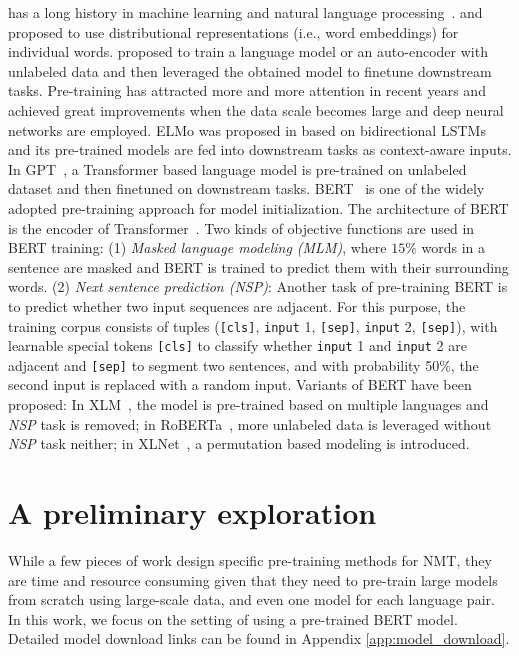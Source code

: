 \documentclass{article} \usepackage{iclr2020_conference,times}
\begin{document}
 has a long history in machine learning and natural language processing~\citep{erhan2009difficulty,erhan2010does}. \citet{mikolov2013distributed} and \citet{pennington2014glove} proposed to use distributional representations (i.e., word embeddings) for individual words. \cite{dai2015semi} proposed to train a language model or an auto-encoder with unlabeled data and then leveraged the obtained model to finetune downstream tasks. Pre-training has attracted more and more attention in recent years and achieved great improvements when the data scale becomes large and deep neural networks are employed. ELMo was proposed in \citet{peters2018deep} based on bidirectional LSTMs and its pre-trained models are fed into downstream tasks as context-aware inputs. In GPT~\citep{radford2018improving}, a Transformer based language model is pre-trained on unlabeled dataset and then finetuned on downstream tasks. BERT~\citep{devlin2018bert} is one of the widely adopted pre-training approach for model initialization. The architecture of BERT is the encoder of Transformer~\citep{vaswani2017attention}. Two kinds of objective functions are used in BERT training: (1) {\em Masked language modeling (MLM)}, where $15\%$ words in a sentence are masked and BERT is trained to predict them with their surrounding words. 
(2) {\em Next sentence prediction (NSP)}: Another task of pre-training BERT is to predict whether two input sequences are adjacent. For this purpose, the training corpus consists of tuples (\texttt{[cls]}, \texttt{input} 1, \texttt{[sep]}, \texttt{input} 2, \texttt{[sep]}), with learnable special tokens \texttt{[cls]} to classify whether \texttt{input} 1 and \texttt{input} 2 are adjacent and \texttt{[sep]} to segment two sentences, and with probability 50\%, the second input is replaced with a random input. Variants of BERT have been proposed: In XLM~\citep{lample2019cross}, the model is pre-trained based on multiple languages and \emph{NSP} task is removed; in RoBERTa~\citep{liu2019roberta}, more unlabeled data is leveraged without {\em NSP} task neither; in XLNet~\citep{yang2019xlnet}, a permutation based modeling is introduced. 

\section{A preliminary exploration}
\label{sec:init_explore}
While a few pieces of work \citep{lample2019cross,song2019mass} design specific pre-training methods for NMT, they are time and resource consuming given that they need to pre-train large models from scratch using large-scale data, and even one model for each language pair. In this work, we focus on the setting of using a pre-trained BERT model. Detailed model download links can be found in Appendix \ref{app:model_download}.
\end{document}
